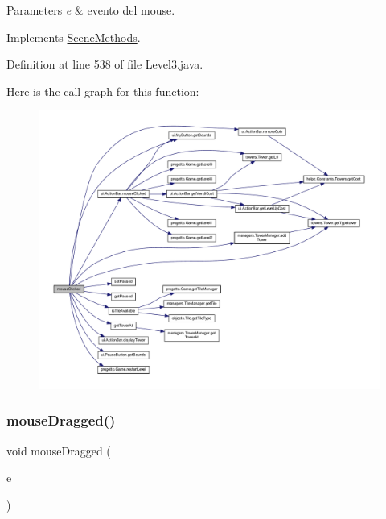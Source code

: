 \begin{DoxyParams}{Parameters}
{\em e} & evento del mouse. \\
\hline
\end{DoxyParams}


Implements \hyperlink{interfacescenes_1_1_scene_methods_a45d56bd84238e8b56589dfc732e2b2cf}{Scene\+Methods}.



Definition at line 538 of file Level3.\+java.

Here is the call graph for this function\+:\nopagebreak
\begin{figure}[H]
\begin{center}
\leavevmode
\includegraphics[width=350pt]{classscenes_1_1_level3_a45d56bd84238e8b56589dfc732e2b2cf_cgraph}
\end{center}
\end{figure}
\mbox{\label{classscenes_1_1_level3_adbfc0588c017133c9b7070474402b72f}} 
\subsubsection{\texorpdfstring{mouse\+Dragged()}{mouseDragged()}}
{\footnotesize\ttfamily void mouse\+Dragged (\begin{DoxyParamCaption}\item[{Mouse\+Event}]{e }\end{DoxyParamCaption})}



